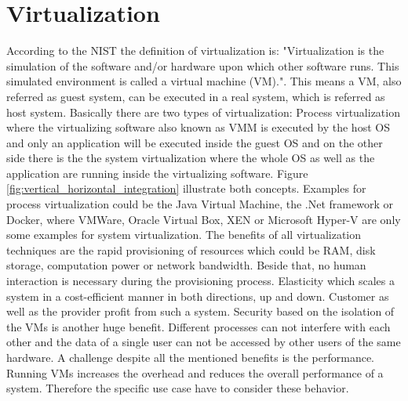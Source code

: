 \section{Virtualization}
According to the \ac{NIST} the definition of virtualization is: "Virtualization is the simulation of the software and/or hardware upon which other software runs. This
simulated environment is called a virtual machine (VM)."\cite{Sca2011}.
This means a \ac{VM}, also referred as guest system, can be executed in a real system, which is referred as host system.
Basically there are two types of virtualization: Process virtualization where the virtualizing software also known as \ac{VMM} is executed by the host \ac{OS} and only an application will be executed inside the guest \ac{OS} and on the other side there is the the system virtualization where the whole \ac{OS} as well as the application are running inside the virtualizing software.
Figure \ref{fig:vertical_horizontal_integration} illustrate both concepts.
Examples for process virtualization could be the Java Virtual Machine, the .Net framework or Docker, where VMWare, Oracle Virtual Box, XEN or Microsoft Hyper-V are only some examples for system virtualization.
The benefits of all virtualization techniques are the rapid provisioning of resources which could be \ac{RAM}, disk storage, computation power or network bandwidth.
Beside that, no human interaction is necessary during the provisioning process.
Elasticity which scales a system in a cost-efficient manner in both directions, up and down.
Customer as well as the provider profit from such a system.
Security based on the isolation of the \acp{VM} is another huge benefit.
Different processes can not interfere with each other and the data of a single user can not be accessed by other users of the same hardware.
A challenge despite all the mentioned benefits is the performance.
Running \acp{VM} increases the overhead and reduces the overall performance of a system.
Therefore the specific use case have to consider these behavior.


